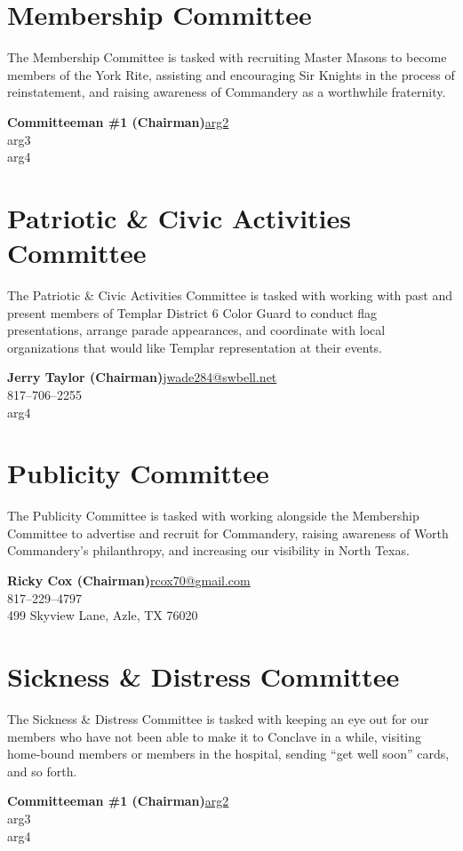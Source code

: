 \documentclass[letterpaper]{article}
\newcommand{\cman}[4]{\textbf{#1}\hspace*{\hfill}\url{#2}\\\hspace*{\hfill}#3\\\hspace*{\hfill}#4}
\newcommand{\comm}[3]{\section*{#1 Committee\textsuperscript{#2}}The #1 Committee is tasked with #3}
\newcommand{\mand}{\CrossMaltese}
\newcommand{\bylaw}{\Cross}
\begin{document}
	\comm{Membership}{\mand}{recruiting Master Masons to become members of the York Rite, assisting and encouraging Sir Knights in the process of reinstatement, and raising awareness of Commandery as a worthwhile fraternity.}
	
		\cman{Committeeman \#1 (Chairman)}{arg2}{arg3}{arg4}
	
	\comm{Patriotic \& Civic Activities}{\mand}{working with past and present members of Templar District \textnumero{} 6 Color Guard to conduct flag presentations, arrange parade appearances, and coordinate with local organizations that would like Templar representation at their events.}
		
		\cman{Jerry Taylor (Chairman)}{jwade284@swbell.net}{817--706--2255}{arg4}
		
	\comm{Publicity}{\mand}{working alongside the Membership Committee to advertise and recruit for Commandery, raising awareness of Worth Commandery's philanthropy, and increasing our visibility in North Texas.}
	
		\cman{Ricky Cox (Chairman)}{rcox70@gmail.com}{817--229--4797}{499 Skyview Lane, Azle, TX 76020}
	
	\comm{Sickness \& Distress}{\bylaw}{keeping an eye out for our members who have not been able to make it to Conclave in a while, visiting home-bound members or members in the hospital, sending ``get well soon'' cards, and so forth.}
	
		\cman{Committeeman \#1 (Chairman)}{arg2}{arg3}{arg4}
	
\end{document}
